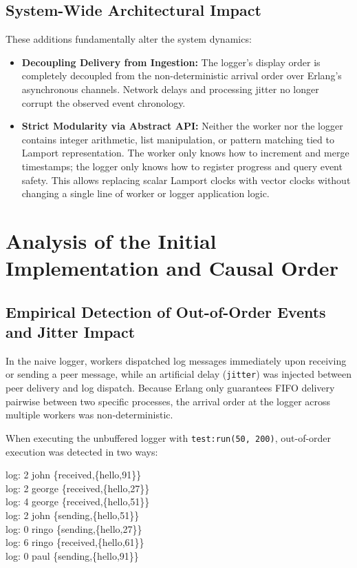 \documentclass[a4paper, 11pt]{article}
\begin{document}
\subsection{System-Wide Architectural Impact}
These additions fundamentally alter the system dynamics:
\begin{itemize}
    \item \textbf{Decoupling Delivery from Ingestion:} The logger's display order is completely decoupled from the non-deterministic arrival order over Erlang's asynchronous channels. Network delays and processing jitter no longer corrupt the observed event chronology.
    \item \textbf{Strict Modularity via Abstract API:} Neither the worker nor the logger contains integer arithmetic, list manipulation, or pattern matching tied to Lamport representation. The worker only knows how to increment and merge timestamps; the logger only knows how to register progress and query event safety. This allows replacing scalar Lamport clocks with vector clocks without changing a single line of worker or logger application logic.
\end{itemize}

\section{Analysis of the Initial Implementation and Causal Order}

\subsection{Empirical Detection of Out-of-Order Events and Jitter Impact}
In the naive logger, workers dispatched log messages immediately upon receiving or sending a peer message, while an artificial delay (\texttt{jitter}) was injected between peer delivery and log dispatch. Because Erlang only guarantees FIFO delivery pairwise between two specific processes, the arrival order at the logger across multiple workers was non-deterministic.

When executing the unbuffered logger with \texttt{test:run(50, 200)}, out-of-order execution was detected in two ways:

\begin{tcolorbox}[terminalbox]
log: 2 john \{received,\{hello,91\}\} \\
log: 2 george \{received,\{hello,27\}\} \\
log: 4 george \{received,\{hello,51\}\} \\
log: 2 john \{sending,\{hello,51\}\} \\
log: 0 ringo \{sending,\{hello,27\}\} \\
log: 6 ringo \{received,\{hello,61\}\} \\
log: 0 paul \{sending,\{hello,91\}\}
\end{tcolorbox}
\end{document}
